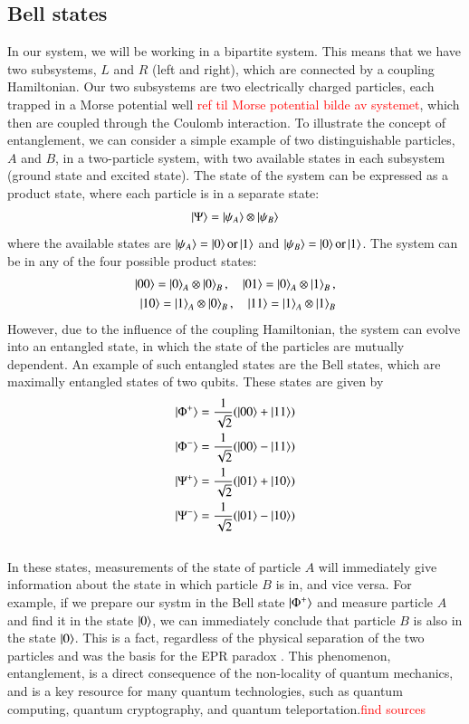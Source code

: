 \documentclass{subfiles}
\begin{document}
\subsection{Bell states}
In our system, we will be working in a bipartite system. This means that we have two subsystems, $L$ and $R$ (left and right), which are connected by a coupling Hamiltonian. Our two subsystems are two electrically charged particles, each trapped in a Morse potential well \textcolor{red}{ref til Morse potential bilde av systemet}, which then are coupled through the Coulomb interaction. 
To illustrate the concept of entanglement, we can consider a simple example of two distinguishable particles, $A$ and $B$, in a two-particle system, with two available states in each subsystem (ground state and excited state). The state of the system can be expressed as a product state, where each particle is in a separate state:
\begin{align*}
    \ket{\Psi} = \ket{\psi_A}\otimes\ket{\psi_B}
\end{align*}
where the available states are $\ket{\psi_A} = \ket{0} \text{or} \ket{1}$ and $\ket{\psi_B} = \ket{0} \text{or} \ket{1}$. The system can be in any of the four possible product states: 
\begin{align*}
    \ket{00} = \ket{0}_A\otimes\ket{0}_B, \quad \ket{01} = \ket{0}_A\otimes\ket{1}_B, \\
    \ket{10} = \ket{1}_A\otimes\ket{0}_B, \quad \ket{11} = \ket{1}_A\otimes\ket{1}_B
\end{align*}
However, due to the influence of the coupling Hamiltonian, the system can evolve into an entangled state, in which the state of the particles are mutually dependent. An example of such entangled states are the Bell states, which are maximally entangled states of two qubits. These states are given by
\begin{align*}
    \ket{\Phi^+} &= \frac{1}{\sqrt{2}}(\ket{00} + \ket{11}) \\
    \ket{\Phi^-} &= \frac{1}{\sqrt{2}}(\ket{00} - \ket{11}) \\
    \ket{\Psi^+} &= \frac{1}{\sqrt{2}}(\ket{01} + \ket{10}) \\
    \ket{\Psi^-} &= \frac{1}{\sqrt{2}}(\ket{01} - \ket{10})
\end{align*}
\\ 
In these states, measurements of the state of particle $A$ will immediately give information about the state in which particle $B$ is in, and vice versa. For example, if we prepare our systm in the Bell state $\ket{\Phi^+}$ and measure particle $A$ and find it in the state $\ket{0}$, we can immediately conclude that particle $B$ is also in the state $\ket{0}$. This is a fact, regardless of the physical separation of the two particles and was the basis for the EPR paradox \cite{EPR_1935}. This phenomenon, entanglement, is a direct consequence of the non-locality of quantum mechanics, and is a key resource for many quantum technologies, such as quantum computing, quantum cryptography, and quantum teleportation.\textcolor{red}{find sources}\\ 
\end{document}
